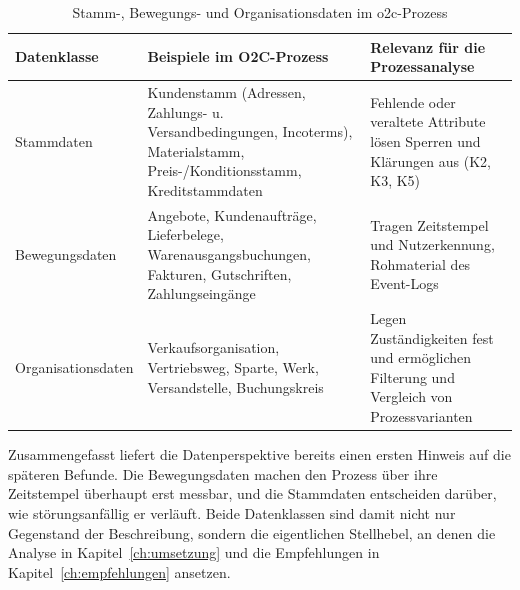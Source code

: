 \begin{table}[!htb]
\centering
\caption{Stamm-, Bewegungs- und Organisationsdaten im \gls{o2c}-Prozess}\label{tab:stamm-bewegungsdaten}
\small
\begin{tabularx}{\textwidth}{@{}l Y Y@{}}
\toprule
\textbf{Datenklasse} & \textbf{Beispiele im O2C-Prozess} & \textbf{Relevanz für die Prozessanalyse} \\
\midrule
Stammdaten & Kundenstamm (Adressen, Zahlungs- u. Versandbedingungen, Incoterms), Materialstamm, Preis-/\allowbreak{}Konditionsstamm, Kreditstammdaten & Fehlende oder veraltete Attribute lösen Sperren und Klärungen aus (K2, K3, K5) \\
Bewegungsdaten & Angebote, Kundenaufträge, Lieferbelege, Warenausgangsbuchungen, Fakturen, Gutschriften, Zahlungseingänge & Tragen Zeitstempel und Nutzerkennung, Rohmaterial des Event-Logs \\
Organisationsdaten & Verkaufsorganisation, Vertriebsweg, Sparte, Werk, Versandstelle, Buchungskreis & Legen Zuständigkeiten fest und ermöglichen Filterung und Vergleich von Prozessvarianten \\
\bottomrule
\end{tabularx}
\end{table}

Zusammengefasst liefert die Datenperspektive bereits einen ersten Hinweis auf die späteren Befunde. Die Bewegungsdaten machen den Prozess über ihre Zeitstempel überhaupt erst messbar, und die Stammdaten entscheiden darüber, wie störungsanfällig er verläuft. Beide Datenklassen sind damit nicht nur Gegenstand der Beschreibung, sondern die eigentlichen Stellhebel, an denen die Analyse in Kapitel~\ref{ch:umsetzung} und die Empfehlungen in Kapitel~\ref{ch:empfehlungen} ansetzen.

